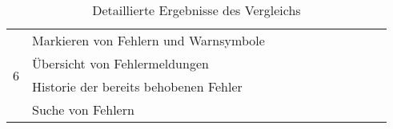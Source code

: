 \begin{table}[htp]
\begin{tabular}{lllllllllll}
    \midrule
    \multirow{4}{*}{6}                                                            & Markieren von Fehlern und Warnsymbole                                                                         &                             &                            &                            &                                  &                      &                         &                                         &                           &                                        \\
                                                                                  & Übersicht von Fehlermeldungen                                                                                 &                             &                            &                            &                                  &                      &                         &                                         &                           &                                        \\
                                                                                  & Historie der bereits behobenen Fehler                                                                         &                             &                            &                            &                                  &                      &                         &                                         &                           &                                        \\
                                                                                  & Suche von Fehlern                                                                                             &                             &                            &                            &                                  &                      &                         &                                         &                           &                                        \\

    \bottomrule
  \end{tabular}
  \caption{Detaillierte Ergebnisse des Vergleichs}
  \label{tbl:kubernetes-manifest-tools-capabilities}
\end{table}





